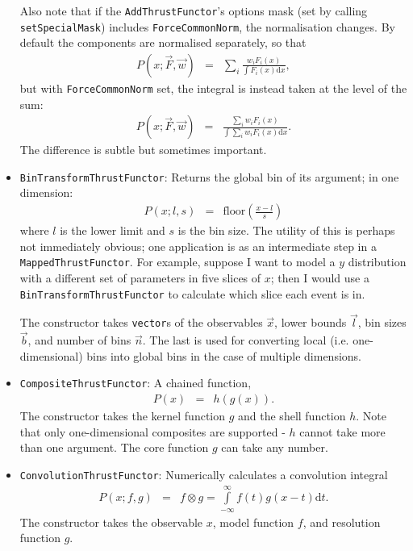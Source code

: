 \documentclass[12pt,pdflatex]{article}
\begin{document}
\begin{itemize}
Also note that if the \texttt{AddThrustFunctor}'s options mask (set by calling
\texttt{setSpecialMask}) includes \texttt{ForceCommonNorm}, the normalisation changes.
By default the components are normalised separately, so that
\begin{eqnarray}
P(x;\vec F, \vec w) &=& \sum\limits_i \frac{w_iF_i(x)}{\int F_i(x) \mathrm{d}x},
\end{eqnarray}
but with \texttt{ForceCommonNorm} set, the integral is instead taken at
the level of the sum:
\begin{eqnarray}
P(x;\vec F, \vec w) &=& \frac{\sum\limits_i w_iF_i(x)}{\int\sum\limits_i w_iF_i(x)\mathrm{d}x}.
\end{eqnarray}
The difference is subtle but sometimes important. 
\item \texttt{BinTransformThrustFunctor}: Returns the global bin of its argument; in one dimension:
\begin{eqnarray}
P(x;l,s) &=& \mathrm{floor}\left(\frac{x-l}{s}\right)
\end{eqnarray}
where $l$ is the lower limit and $s$ is the bin size. The utility of
this is perhaps not immediately obvious; one application is as an intermediate
step in a \texttt{MappedThrustFunctor}. For example, suppose I want to 
model a $y$ distribution with a different set of parameters in five slices
of $x$; then I would use a \texttt{BinTransformThrustFunctor} to calculate
which slice each event is in. 

The constructor
takes \texttt{vector}s of the observables $\vec x$, lower bounds $\vec l$,
bin sizes $\vec b$, and number of bins $\vec n$. The last is used for converting
local (i.e. one-dimensional) bins into global bins in the case of multiple dimensions. 
\item \texttt{CompositeThrustFunctor}: A chained function, 
\begin{eqnarray}
P(x) &=& h(g(x)).
\end{eqnarray}
The constructor takes the kernel function $g$ and the shell function $h$. 
Note that only one-dimensional composites are supported - $h$ cannot take more
than one argument. The core function $g$ can take any number. 
\item \texttt{ConvolutionThrustFunctor}: Numerically calculates a convolution integral
\begin{eqnarray}
P(x;f,g) &=& f\otimes g = \int\limits_{-\infty}^\infty f(t) g(x-t) \mathrm{d}t.
\end{eqnarray}
The constructor takes the observable $x$, model function $f$, and resolution function $g$.


\end{itemize}
\end{document}
